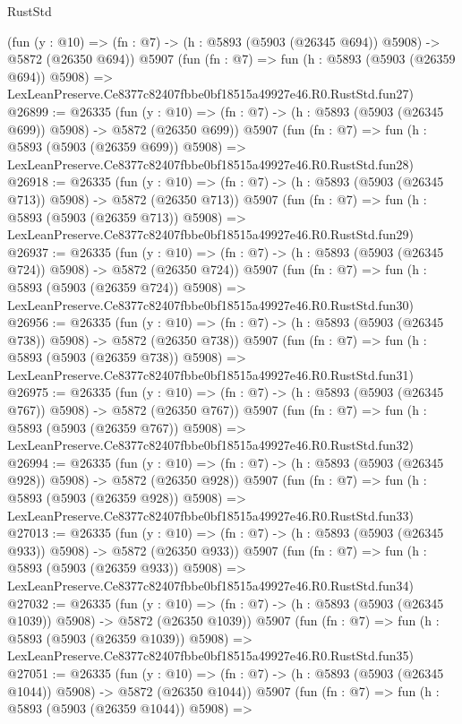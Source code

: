\begin{lexlean}{RustStd}
\begin{coremodule}
    (fun (y : @10) => (fn : @7) -> (h : @5893 (@5903 (@26345 @694)) @5908) -> @5872 (@26350 @694))
    @5907
    (fun (fn : @7) =>
    fun (h : @5893 (@5903 (@26359 @694)) @5908) =>
    LexLeanPreserve.Ce8377c82407fbbe0bf18515a49927e46.R0.RustStd.fun27)
@26899 := @26335
    (fun (y : @10) => (fn : @7) -> (h : @5893 (@5903 (@26345 @699)) @5908) -> @5872 (@26350 @699))
    @5907
    (fun (fn : @7) =>
    fun (h : @5893 (@5903 (@26359 @699)) @5908) =>
    LexLeanPreserve.Ce8377c82407fbbe0bf18515a49927e46.R0.RustStd.fun28)
@26918 := @26335
    (fun (y : @10) => (fn : @7) -> (h : @5893 (@5903 (@26345 @713)) @5908) -> @5872 (@26350 @713))
    @5907
    (fun (fn : @7) =>
    fun (h : @5893 (@5903 (@26359 @713)) @5908) =>
    LexLeanPreserve.Ce8377c82407fbbe0bf18515a49927e46.R0.RustStd.fun29)
@26937 := @26335
    (fun (y : @10) => (fn : @7) -> (h : @5893 (@5903 (@26345 @724)) @5908) -> @5872 (@26350 @724))
    @5907
    (fun (fn : @7) =>
    fun (h : @5893 (@5903 (@26359 @724)) @5908) =>
    LexLeanPreserve.Ce8377c82407fbbe0bf18515a49927e46.R0.RustStd.fun30)
@26956 := @26335
    (fun (y : @10) => (fn : @7) -> (h : @5893 (@5903 (@26345 @738)) @5908) -> @5872 (@26350 @738))
    @5907
    (fun (fn : @7) =>
    fun (h : @5893 (@5903 (@26359 @738)) @5908) =>
    LexLeanPreserve.Ce8377c82407fbbe0bf18515a49927e46.R0.RustStd.fun31)
@26975 := @26335
    (fun (y : @10) => (fn : @7) -> (h : @5893 (@5903 (@26345 @767)) @5908) -> @5872 (@26350 @767))
    @5907
    (fun (fn : @7) =>
    fun (h : @5893 (@5903 (@26359 @767)) @5908) =>
    LexLeanPreserve.Ce8377c82407fbbe0bf18515a49927e46.R0.RustStd.fun32)
@26994 := @26335
    (fun (y : @10) => (fn : @7) -> (h : @5893 (@5903 (@26345 @928)) @5908) -> @5872 (@26350 @928))
    @5907
    (fun (fn : @7) =>
    fun (h : @5893 (@5903 (@26359 @928)) @5908) =>
    LexLeanPreserve.Ce8377c82407fbbe0bf18515a49927e46.R0.RustStd.fun33)
@27013 := @26335
    (fun (y : @10) => (fn : @7) -> (h : @5893 (@5903 (@26345 @933)) @5908) -> @5872 (@26350 @933))
    @5907
    (fun (fn : @7) =>
    fun (h : @5893 (@5903 (@26359 @933)) @5908) =>
    LexLeanPreserve.Ce8377c82407fbbe0bf18515a49927e46.R0.RustStd.fun34)
@27032 := @26335
    (fun (y : @10) => (fn : @7) -> (h : @5893 (@5903 (@26345 @1039)) @5908) -> @5872 (@26350 @1039))
    @5907
    (fun (fn : @7) =>
    fun (h : @5893 (@5903 (@26359 @1039)) @5908) =>
    LexLeanPreserve.Ce8377c82407fbbe0bf18515a49927e46.R0.RustStd.fun35)
@27051 := @26335
    (fun (y : @10) => (fn : @7) -> (h : @5893 (@5903 (@26345 @1044)) @5908) -> @5872 (@26350 @1044))
    @5907
    (fun (fn : @7) =>
    fun (h : @5893 (@5903 (@26359 @1044)) @5908) =>

\end{coremodule}
\end{lexlean}
